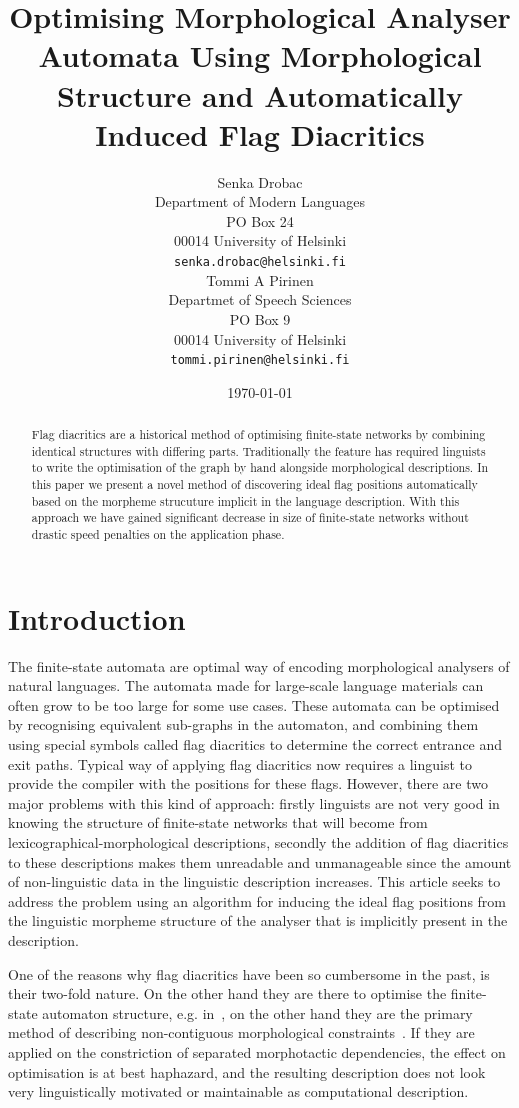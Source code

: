 \documentclass[11pt]{article}
\title{Optimising Morphological Analyser Automata Using Morphological Structure
and Automatically Induced Flag Diacritics}
\author{Senka Drobac \\
Department of Modern Languages \\
PO Box 24 \\
00014 University of Helsinki \\
  {\tt senka.drobac@helsinki.fi} \\\And
  Tommi A Pirinen \\
Departmet of Speech Sciences\\
PO Box 9\\
00014 University of Helsinki\\
  {\tt tommi.pirinen@helsinki.fi} \\}\\\And
\date{\today}
\begin{document}
\maketitle
\begin{abstract}
    Flag diacritics are a historical method of optimising finite-state networks
    by combining identical structures with differing parts. Traditionally the
    feature has required linguists to write the optimisation of the graph by
    hand alongside morphological descriptions. In this paper we present a novel
    method of discovering ideal flag positions automatically based on the
    morpheme strucuture implicit in the language description. With this
    approach we have gained significant decrease in size of finite-state networks
    without drastic speed penalties on the application phase.
\end{abstract}

\section{Introduction}

The finite-state automata are optimal way of encoding morphological analysers
of natural languages. The automata made for large-scale language materials can
often grow to be too large for some use cases. These automata can be optimised
by recognising equivalent sub-graphs in the automaton, and combining them using
special symbols called flag diacritics to determine the correct entrance and
exit paths. Typical way of applying flag diacritics now requires a linguist to
provide the compiler with the positions for these flags. However, there are two
major problems with this kind of approach: firstly linguists are not very good
in knowing the structure of finite-state networks that will become from
lexicographical-morphological descriptions, secondly the addition of flag
diacritics to these descriptions makes them unreadable and unmanageable since
the amount of non-linguistic data in the linguistic description increases. This
article seeks to address the problem using an algorithm for inducing the ideal
flag positions from the linguistic morpheme structure of the analyser that is
implicitly present in the description. 

One of the reasons why flag diacritics have been so cumbersome in the past,
is their two-fold nature. On the other hand they are there to optimise the
finite-state automaton structure, e.g. in~\cite{karttunen2006numbers}, on the
other hand they are the primary method of describing non-contiguous 
morphological constraints~\cite{beesley1998constraining}. If they are applied
on the constriction of separated morphotactic dependencies, the effect on
optimisation is at best haphazard, and the resulting description does not
look very linguistically motivated or maintainable as computational description.
\end{document}
